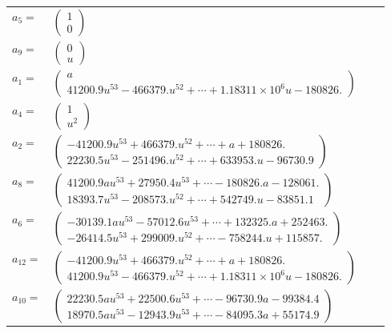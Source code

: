 \documentclass[1p]{elsarticle_modified}
\theoremstyle{definition}
\begin{document}
\begin{tabular}{m{7pt} m{180pt} m{7pt} m{180pt} }
\flushright $a_{5}=$&$\begin{pmatrix}1\\0\end{pmatrix}$ \\
\flushright $a_{9}=$&$\begin{pmatrix}0\\u\end{pmatrix}$ \\
\flushright $a_{1}=$&$\begin{pmatrix}a\\41200.9 u^{53}-466379. u^{52}+\cdots+1.18311\times10^{6} u-180826.\end{pmatrix}$ \\
\flushright $a_{4}=$&$\begin{pmatrix}1\\u^2\end{pmatrix}$ \\
\flushright $a_{2}=$&$\begin{pmatrix}-41200.9 u^{53}+466379. u^{52}+\cdots+a+180826.\\22230.5 u^{53}-251496. u^{52}+\cdots+633953. u-96730.9\end{pmatrix}$ \\
\flushright $a_{8}=$&$\begin{pmatrix}41200.9 a u^{53}+27950.4 u^{53}+\cdots-180826. a-128061.\\18393.7 u^{53}-208573. u^{52}+\cdots+542749. u-83851.1\end{pmatrix}$ \\
\flushright $a_{6}=$&$\begin{pmatrix}-30139.1 a u^{53}-57012.6 u^{53}+\cdots+132325. a+252463.\\-26414.5 u^{53}+299009. u^{52}+\cdots-758244. u+115857.\end{pmatrix}$ \\
\flushright $a_{12}=$&$\begin{pmatrix}-41200.9 u^{53}+466379. u^{52}+\cdots+a+180826.\\41200.9 u^{53}-466379. u^{52}+\cdots+1.18311\times10^{6} u-180826.\end{pmatrix}$ \\
\flushright $a_{10}=$&$\begin{pmatrix}22230.5 a u^{53}+22500.6 u^{53}+\cdots-96730.9 a-99384.4\\18970.5 a u^{53}-12943.9 u^{53}+\cdots-84095.3 a+55174.9\end{pmatrix}$ \\

\end{tabular}
\end{document}
